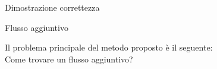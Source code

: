 \begin{frame}{Dimostrazione correttezza}
\begin{overprint}
\end{overprint}

\end{frame}

\begin{frame}{Flusso aggiuntivo}

\vspace{-9pt}
\begin{myboxtitle}[Domanda]
Il problema principale del metodo proposto è il seguente:\\ 
\alert{Come trovare un 
flusso aggiuntivo}? 
\end{myboxtitle}

\begin{center}
\end{center}

\end{frame}



